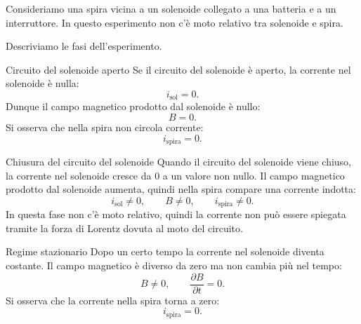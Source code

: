 \documentclass[a4paper]{article}
\begin{document}
Consideriamo una spira vicina a un solenoide collegato a una batteria e a un interruttore. In questo esperimento non c'è moto relativo tra solenoide e spira.

\begin{center}
\end{center}

Descriviamo le fasi dell'esperimento.

\begin{snippetexample}{Circuito del solenoide aperto}
Se il circuito del solenoide è aperto, la corrente nel solenoide è nulla:
\[
    i_{\text{sol}}=0.
\]
Dunque il campo magnetico prodotto dal solenoide è nullo:
\[
    B=0.
\]
Si osserva che nella spira non circola corrente:
\[
    i_{\text{spira}}=0.
\]
\end{snippetexample}

\begin{snippetexample}{Chiusura del circuito del solenoide}
Quando il circuito del solenoide viene chiuso, la corrente nel solenoide cresce da \(0\) a un valore non nullo. Il campo magnetico prodotto dal solenoide aumenta, quindi nella spira compare una corrente indotta:
\[
    i_{\text{sol}}\neq 0,
    \qquad
    B\neq 0,
    \qquad
    i_{\text{spira}}\neq 0.
\]
In questa fase non c'è moto relativo, quindi la corrente non può essere spiegata tramite la forza di Lorentz dovuta al moto del circuito.
\end{snippetexample}

\begin{snippetexample}{Regime stazionario}
Dopo un certo tempo la corrente nel solenoide diventa costante. Il campo magnetico è diverso da zero ma non cambia più nel tempo:
\[
    B\neq 0,
    \qquad
    \frac{\partial B}{\partial t}=0.
\]
Si osserva che la corrente nella spira torna a zero:
\[
    i_{\text{spira}}=0.
\]
\end{snippetexample}
\end{document}
